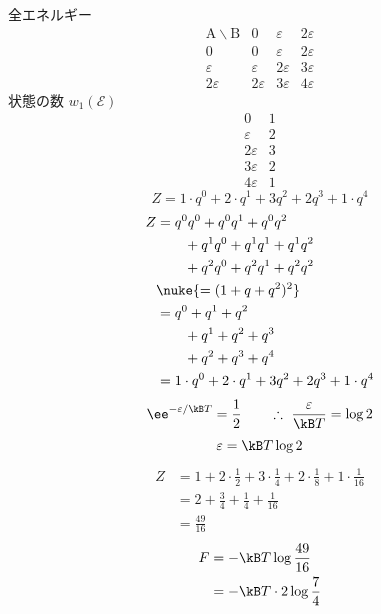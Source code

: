 全エネルギー
\[
\begin{array}{c|ccc}
\mathrm{A}\backslash\mathrm{B} & 0 & \varepsilon & 2\varepsilon\\ \hline
0 & 0 & \varepsilon & 2\varepsilon\\
\varepsilon & \varepsilon & 2\varepsilon & 3\varepsilon\\
2\varepsilon & 2\varepsilon & 3\varepsilon & 4\varepsilon
\end{array}
\]
状態の数 $w_{1}(\mathcal{E})$
\[
\begin{array}{c|c}
0 & 1\\ \hline
\varepsilon & 2\\ \hline
2\varepsilon & 3\\ \hline
3\varepsilon & 2\\ \hline
4\varepsilon & 1
\end{array}
\]
\[ Z=1\cdot q^{0}+2\cdot q^{1}+3q^{2}+2q^{3}+1\cdot q^{4} \]
\begin{align*}
Z&=q^{0}q^{0}+q^{0}q^{1}+q^{0}q^{2}\\
&\qquad+q^{1}q^{0}+q^{1}q^{1}+q^{1}q^{2}\\
&\qquad+q^{2}q^{0}+q^{2}q^{1}+q^{2}q^{2}\\
&\nuke{=(1+q+q^{2})^{2}}\\
&=q^{0}+q^{1}+q^{2}\\
&\qquad+q^{1}+q^{2}+q^{3}\\
&\qquad+q^{2}+q^{3}+q^{4}\\
&=1\cdot q^{0}+2\cdot q^{1}+3q^{2}+2q^{3}+1\cdot q^{4}
\end{align*}
\[ \ee^{-\varepsilon/\kB T}=\frac{1}{2}\qquad\therefore\ \frac{\varepsilon}{\kB T}=\log2 \]
\[ \varepsilon=\kB T\log2 \]
\begin{align*}
Z&=1+2\cdot\frac{1}{2}+3\cdot\frac{1}{4}+2\cdot\frac{1}{8}+1\cdot\frac{1}{16}\\
&=2+\frac{3}{4}+\frac{1}{4}+\frac{1}{16}\\
&=\frac{49}{16}
\end{align*}
\begin{align*}
F&=-\kB T\log\frac{49}{16}\\
&=-\kB T\cdot2\log\frac{7}{4}
\end{align*}
